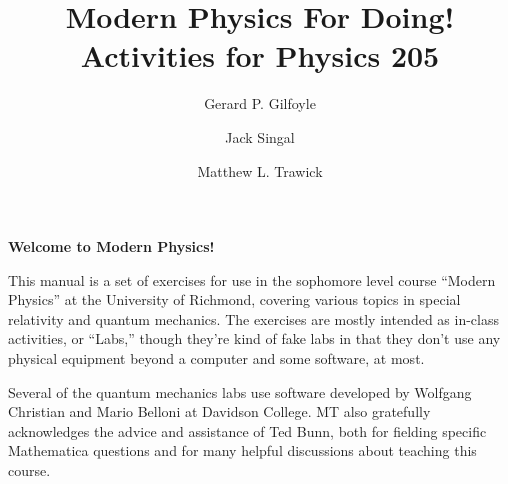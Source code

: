 

\title{Modern Physics For Doing!\\
Activities for Physics 205}

\author{Gerard P. Gilfoyle}
\author{Jack Singal}
\author{Matthew L. Trawick}

\maketitle

\vspace{0.8 in}


\begin{center}
\large{\textbf{Welcome to Modern Physics!}}
\end{center}


This manual is a set of exercises for use in the sophomore level course ``Modern Physics'' at the University of Richmond, covering various topics in special relativity and quantum mechanics.  The exercises are mostly intended as in-class activities, or ``Labs,'' though they're kind of fake labs in that they don't use any physical equipment beyond a computer and some software, at most.

Several of the quantum mechanics labs use software developed by Wolfgang Christian and Mario Belloni at Davidson College.  MT also gratefully acknowledges the advice and assistance of Ted Bunn, both for fielding specific Mathematica questions and for many helpful discussions about teaching this course.



\newpage
\
\thispagestyle{plain}

\newpage
\
